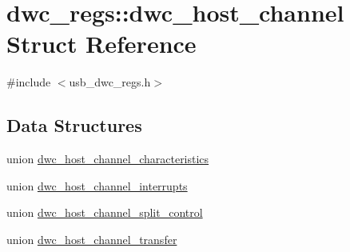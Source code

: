 \hypertarget{structdwc__regs_1_1dwc__host__channel}{\section{dwc\-\_\-regs\-:\-:dwc\-\_\-host\-\_\-channel Struct Reference}
\label{structdwc__regs_1_1dwc__host__channel}
}


{\ttfamily \#include $<$usb\-\_\-dwc\-\_\-regs.\-h$>$}

\subsection*{Data Structures}
\begin{DoxyCompactItemize}
\item 
union \hyperlink{uniondwc__regs_1_1dwc__host__channel_1_1dwc__host__channel__characteristics}{dwc\-\_\-host\-\_\-channel\-\_\-characteristics}
\item 
union \hyperlink{uniondwc__regs_1_1dwc__host__channel_1_1dwc__host__channel__interrupts}{dwc\-\_\-host\-\_\-channel\-\_\-interrupts}
\item 
union \hyperlink{uniondwc__regs_1_1dwc__host__channel_1_1dwc__host__channel__split__control}{dwc\-\_\-host\-\_\-channel\-\_\-split\-\_\-control}
\item 
union \hyperlink{uniondwc__regs_1_1dwc__host__channel_1_1dwc__host__channel__transfer}{dwc\-\_\-host\-\_\-channel\-\_\-transfer}
\end{DoxyCompactItemize}
